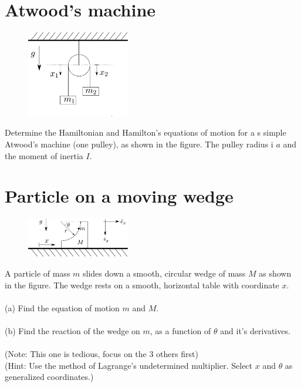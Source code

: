 \documentclass{article}
\begin{document}
    \section{Atwood's machine}
    \begin{figure}
        \includegraphics[width=0.4\textwidth]{figures/figure_3.pdf}
    \end{figure}
    Determine the Hamiltonian and Hamilton's equations of motion for a s simple Atwood's machine (one pulley), as shown in the figure. The pulley radius i $a$ and the moment of inertia $I$.

    \section{Particle on a moving wedge}
    \begin{figure}
        \includegraphics[width=0.4\textwidth]{figures/figure_4.pdf}
    \end{figure}
    A particle of mass $m$ slides down a smooth, circular wedge of mass $M$ as shown in the figure. The wedge rests on a smooth, horizontal table with coordinate $x$. \\ \\
    (a) Find the equation of motion $m$ and $M$. \\ \\
    (b) Find the reaction of the wedge on $m$, as a function of $\theta$ and it's derivatives. \\ \\
    (Note: This one is tedious, focus on the 3 others first) \\ 
    (Hint: Use the method of Lagrange's undetermined multiplier. Select $x$ and $\theta$ as generalized coordinates.)
\end{document}
